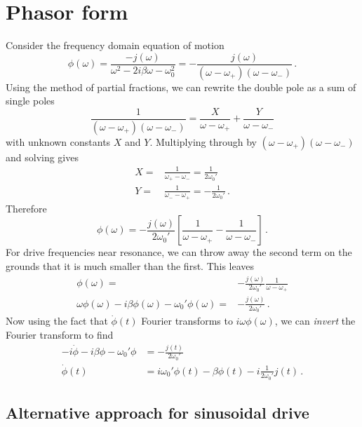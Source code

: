 \documentclass{article}
\begin{document}
\section{Phasor form}

Consider the frequency domain equation of motion
\begin{equation}
  \phi(\omega) = \frac{-j(\omega)}{\omega^2 - 2 i \beta \omega - \omega_0^2}
  = - \frac{j(\omega)}{(\omega - \omega_+)(\omega - \omega_-)} \, .
\end{equation}
Using the method of partial fractions, we can rewrite the double pole as a sum of single poles
\begin{equation}
  \frac{1}{(\omega - \omega_+)(\omega - \omega_-)}
  = \frac{X}{\omega - \omega_+} + \frac{Y}{\omega - \omega_-}
\end{equation}
with unknown constants $X$ and $Y$.
Multiplying through by $(\omega - \omega_+)(\omega - \omega_-)$ and solving gives
\begin{align*}
  X =& \frac{1}{\omega_+ - \omega_-} =   \frac{1}{2 \omega_0'} \\
  Y =& \frac{1}{\omega_- - \omega_+} = - \frac{1}{2 \omega_0'} \, .
\end{align*}
Therefore
\begin{equation}
  \phi(\omega) = - \frac{j(\omega)}{2 \omega_0'}
  \left[ \frac{1}{\omega - \omega_+} - \frac{1}{\omega - \omega_-} \right] \, .
\end{equation}
For drive frequencies near resonance, we can throw away the second term on the grounds that it is much smaller than the first.
This leaves
\begin{align*}
  \phi(\omega) =& -\frac{j(\omega)}{2 \omega_0'} \frac{1}{\omega - \omega_+} \\
  \omega \phi(\omega) - i \beta \phi(\omega) - \omega_0' \phi(\omega) =& - \frac{j(\omega)}{2 \omega_0'} \, .
\end{align*}
Now using the fact that $\dot{\phi}(t)$ Fourier transforms to $i \omega \phi(\omega)$, we can \emph{invert} the Fourier transform to find
\begin{align*}
  -i \dot{\phi} - i \beta \phi - \omega_0' \phi &= - \frac{j(t)}{2 \omega_0'} \\
  \dot{\phi}(t) &= i \omega_0' \phi(t) - \beta \phi(t) - i \frac{1}{2\omega_0'} j(t) \, .
\end{align*}

\subsection{Alternative approach for sinusoidal drive}
\end{document}
